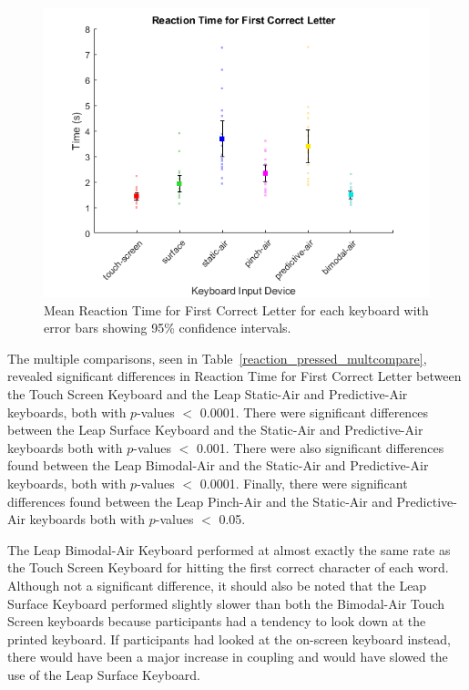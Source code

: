 \begin{figure}[h]
	\centering
	\includegraphics{fig_reaction_pressed_mean}
	\caption[Mean Reaction Time for First Correct Letter]{Mean Reaction Time for First Correct Letter for each keyboard with error bars showing 95\% confidence intervals.}
	\label{fig_reaction_pressed_mean}
\end{figure}

The multiple comparisons, seen in Table~\ref{reaction_pressed_multcompare}, revealed significant differences in Reaction Time for First Correct Letter between the Touch Screen Keyboard and the Leap Static-Air and Predictive-Air keyboards, both with $p$-values $<$ 0.0001. There were significant differences between the Leap Surface Keyboard and the Static-Air and Predictive-Air keyboards both with $p$-values $<$ 0.001. There were also significant differences found between the Leap Bimodal-Air and the Static-Air and Predictive-Air keyboards, both with $p$-values $<$ 0.0001. Finally, there were significant differences found between the Leap Pinch-Air and the Static-Air and Predictive-Air keyboards both with $p$-values $<$ 0.05.

The Leap Bimodal-Air Keyboard performed at almost exactly the same rate as the Touch Screen Keyboard for hitting the first correct character of each word. Although not a significant difference, it should also be noted that the Leap Surface Keyboard performed slightly slower than both the Bimodal-Air Touch Screen keyboards because participants had a tendency to look down at the printed keyboard. If participants had looked at the on-screen keyboard instead, there would have been a major increase in coupling and would have slowed the use of the Leap Surface Keyboard.

